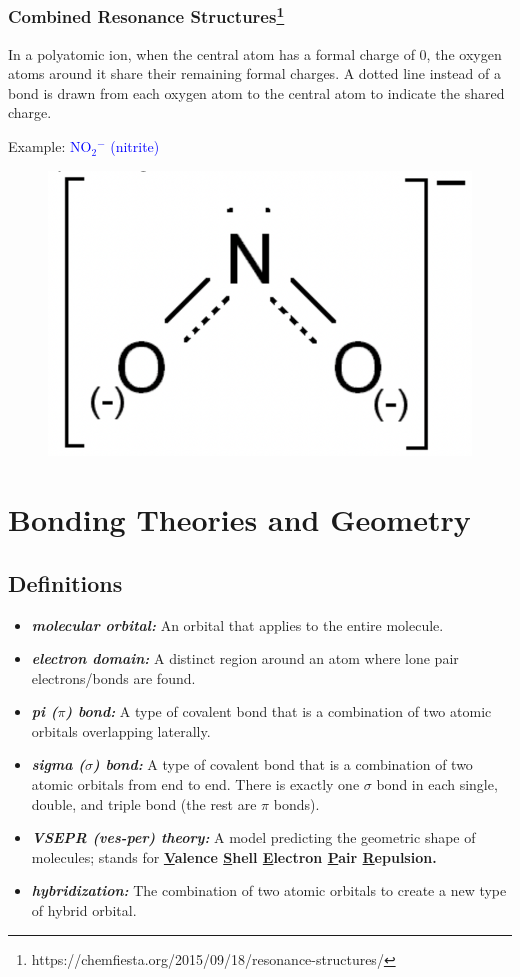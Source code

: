 \documentclass[a4paper, 12pt]{article}
\begin{document}
\subsubsection*{Combined Resonance Structures\footnote{https://chemfiesta.org/2015/09/18/resonance-structures/}}
In a polyatomic ion, when the central atom has a formal charge of 0, the oxygen atoms around it share their remaining formal charges. A dotted line instead of a bond is drawn from each oxygen atom to the central atom to indicate the shared charge.
 
Example: \textcolor{blue}{NO$_2$$^-$ (nitrite)}

\begin{figure}
    \centering
    \includegraphics[width=0.3\linewidth]{combinedresonance.png}
    \label{fig:something???}
\end{figure}

\section{Bonding Theories and Geometry}

\subsection*{Definitions}
\begin{itemize}[leftmargin=*, nosep]
    \item \textbf{\textit{molecular orbital:}} An orbital that applies to the entire molecule.
    \item \textbf{\textit{electron domain:}} A distinct region around an atom where lone pair electrons/bonds are found.
    \item \textbf{\textit{pi ($\pi$) bond:}} A type of covalent bond that is a combination of two atomic orbitals overlapping laterally.
    \item \textbf{\textit{sigma ($\sigma$) bond:}} A type of covalent bond that is a combination of two atomic orbitals from end to end. There is exactly one $\sigma$ bond in each single, double, and triple bond (the rest are $\pi$ bonds).
    \item \textbf{\textit{VSEPR (ves-per) theory:}} A model predicting the geometric shape of molecules; stands for \textbf{\underline{V}alence \underline{S}hell \underline{E}lectron \underline{P}air \underline{R}epulsion.}
    \item \textbf{\textit{hybridization:}} The combination of two atomic orbitals to create a new type of hybrid orbital.

\end{itemize}
\end{document}
